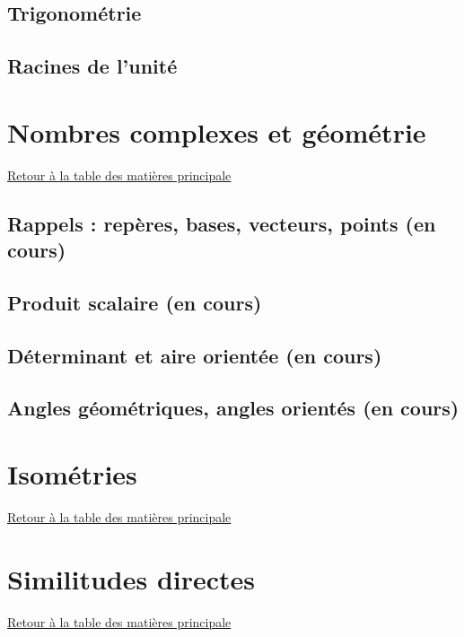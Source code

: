 \documentclass[11pt,a4paper,oneside]{book}
\newcommand{\retourTOC}{Retour à la table des matières principale}
\theoremstyle{definition}
\theoremstyle{plain}
\begin{document}
\section{Trigonométrie}
\label{sec:trigo}



\section{Racines de l'unité}
\label{sec:cyclotomie}



\chapter{Nombres complexes et géométrie}
\minitoc
\hyperlink{toc}{\retourTOC}

\section{Rappels : repères, bases, vecteurs, points (en cours)}
\label{sec:rappels_geom}


\section{Produit scalaire (en cours)}
\label{sec:produit_scalaire}


\section{Déterminant et aire orientée (en cours)}
\label{sec:determinant}


\section{Angles géométriques, angles orientés (en cours)}
\label{sec:angles}


\chapter{Isométries}
\minitoc
\hyperlink{toc}{\retourTOC}



\chapter{Similitudes directes}
\minitoc
\hyperlink{toc}{\retourTOC}
\end{document}
